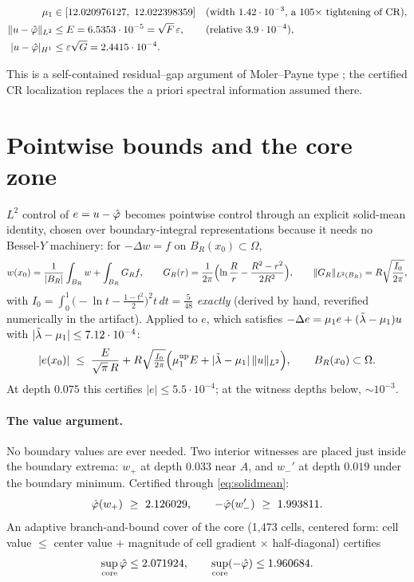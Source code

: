 \documentclass[11pt]{article}
\begin{document}
\begin{proposition}\label{prop:eigenpair}
\begin{align}
\mu_1 &\in [12.020976127,\ 12.022398359]
&&\text{(width $1.42\cdot10^{-3}$, a $105\times$ tightening of CR)},
\notag\\
\lVert u-\hat\varphi \rVert_{L^2} &\le E = 6.5353\cdot10^{-5}
= \sqrt{F}\,\varepsilon,
&&\text{(relative $3.9\cdot10^{-4}$)},
\notag\\
|u-\hat\varphi|_{H^1} &\le \varepsilon\sqrt{G} = 2.4415\cdot10^{-4}.
\notag
\end{align}
\end{proposition}

This is a self-contained residual--gap argument of Moler--Payne type
\cite{MolerPayne}; the certified CR localization replaces the a priori
spectral information assumed there.

\section{Pointwise bounds and the core zone}\label{sec:core}

$L^2$ control of $e=u-\hat\varphi$ becomes pointwise control through an
explicit solid-mean identity, chosen over boundary-integral
representations because it needs no Bessel-$Y$ machinery: for
$-\Delta w=f$ on $B_R(x_0)\subset\Omega$,
\[
w(x_0)=\frac{1}{|B_R|}\int_{B_R} w+\int_{B_R}G_R f,\qquad
G_R(r)=\frac{1}{2\pi}\Bigl(\ln\frac{R}{r}-\frac{R^2-r^2}{2R^2}\Bigr),\qquad
\lVert G_R \rVert_{L^2(B_R)}=R\sqrt{\frac{I_0}{2\pi}},
\]
with $I_0=\int_0^1\bigl(-\ln t-\tfrac{1-t^2}{2}\bigr)^2 t\,dt =
\frac{5}{48}$ \emph{exactly} (derived by hand, reverified numerically in
the artifact). Applied to $e$, which satisfies
$-\Delta e=\mu_1e+(\tilde\lambda-\mu_1)u$ with $|\tilde\lambda-\mu_1|\le 7.12\cdot10^{-4}$:
\begin{equation}\label{eq:solidmean}
|e(x_0)| \;\le\; \frac{E}{\sqrt{\pi}\,R}
+ R\sqrt{\tfrac{I_0}{2\pi}}\Bigl(\mu_1^{\mathrm{up}}E
+ |\tilde\lambda-\mu_1|\,\lVert u \rVert_{L^2}\Bigr),
\qquad B_R(x_0)\subset\Omega .
\end{equation}
At depth $0.075$ this certifies $|e|\le 5.5\cdot10^{-4}$; at the witness
depths below, ${\sim}10^{-3}$.

\paragraph{The value argument.}
No boundary values are ever needed. Two interior witnesses are placed
just inside the boundary extrema: $w_+$ at depth $0.033$ near $A$, and
$w_-'$ at depth $0.019$ under the boundary minimum. Certified through
\eqref{eq:solidmean}:
\[
\phih(w_+)\ \ge\ 2.126029, \qquad -\phih(w_-')\ \ge\ 1.993811 .
\]
An adaptive branch-and-bound cover of the core (1{,}473 cells, centered
form: cell value $\le$ center value $+$ magnitude of cell gradient
$\times$ half-diagonal) certifies
\[
\sup_{\mathrm{core}}\hat\varphi \le 2.071924, \qquad
\sup_{\mathrm{core}}(-\hat\varphi) \le 1.960684 .
\]
\end{document}
